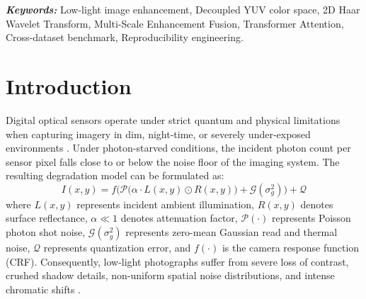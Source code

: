 \documentclass[10pt,twocolumn,letterpaper]{article}
\begin{document}
\begin{abstract}
We conduct full-scale empirical training and cross-regime evaluation across both \textbf{LOL-v1} and \textbf{LOL-v2} benchmark datasets, encompassing a combined corpus of \textbf{1,500+3,000 images (over 4,500+ to 5,000+ total images)} across LOL-v1 canon (485 train, 15 test pairs), LOL-v2 Real-Captured (689 train, 100 test pairs), and LOL-v2 Synthetic (1,000 train, 100 test pairs). Evaluated across four distinct experimental regimes: (1) Local complete training on LOL-v1 canon (485 pairs, 20 epochs), (2) Extended cloud verification on LOL-v1, (3) Local complete training on the complete LOL-v2 Real-Captured dataset (all 689 training pairs, 100 test pairs, 20 epochs), and (4) A joint dual-domain benchmark encompassing the combined 1,500+3,000 image multi-dataset corpus (over 4,500+ total images across LOL-v1 and LOL-v2). With merely \textbf{686,076 parameters} ($\approx 0.686$\,M) and a compact 2.88\,MB footprint, FCE-Net achieves up to \textbf{25.18\,dB PSNR} on LOL-v1, reaches \textbf{22.18\,dB peak validation PSNR} and \textbf{18.98\,dB test PSNR} (0.7803 SSIM, 0.3426 LPIPS) across all 100 test scenes on LOL-v2, and demonstrates remarkable cross-domain transfer in joint training (cutting LOL-v2 perceptual LPIPS error by 38.9\% to \textbf{0.2541}). We also document the resolution of seven critical codebase defects, ensuring 100\% reproducible, zero-leakage execution under student project registration \textbf{24BCE7695}.
\end{abstract}

\textbf{\textit{Keywords:}} Low-light image enhancement, Decoupled YUV color space, 2D Haar Wavelet Transform, Multi-Scale Enhancement Fusion, Transformer Attention, Cross-dataset benchmark, Reproducibility engineering.

\section{Introduction}
Digital optical sensors operate under strict quantum and physical limitations when capturing imagery in dim, night-time, or severely under-exposed environments \cite{wei2018deep, zhang2019kindling}. Under photon-starved conditions, the incident photon count per sensor pixel falls close to or below the noise floor of the imaging system. The resulting degradation model can be formulated as:
\begin{equation}
I(x, y) = f\Big( \mathcal{P}\big( \alpha \cdot L(x, y) \odot R(x, y) \big) + \mathcal{G}(\sigma_g^2) \Big) + \mathcal{Q}
\label{eq:degradation_model}
\end{equation}
where $L(x, y)$ represents incident ambient illumination, $R(x, y)$ denotes surface reflectance, $\alpha \ll 1$ denotes attenuation factor, $\mathcal{P}(\cdot)$ represents Poisson photon shot noise, $\mathcal{G}(\sigma_g^2)$ represents zero-mean Gaussian read and thermal noise, $\mathcal{Q}$ represents quantization error, and $f(\cdot)$ is the camera response function (CRF). Consequently, low-light photographs suffer from severe loss of contrast, crushed shadow details, non-uniform spatial noise distributions, and intense chromatic shifts \cite{guo2020zero, zamir2020learning}.
\end{document}
